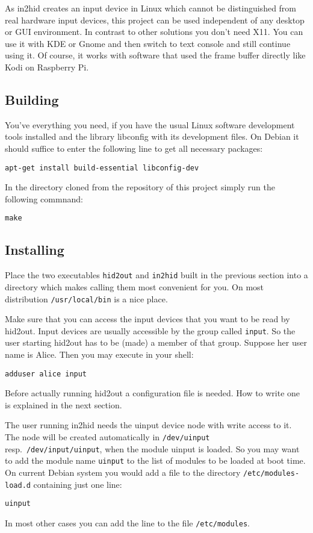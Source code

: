 As in2hid creates an input device in Linux which cannot be distinguished
from real hardware input devices, this project can be used independent
of any desktop or GUI environment. In contrast to other solutions
you don't need X11. You can use it with KDE or Gnome and then switch to 
text console and still continue using it. Of course, it works with 
software that used the frame buffer directly like Kodi on Raspberry Pi.

\subsection{Building}
You've everything you need,
if you have the usual Linux software development tools installed
and the library libconfig with its development files.
On Debian it should suffice to enter the following line to
get all necessary packages:
\begin{verbatim}
apt-get install build-essential libconfig-dev
\end{verbatim}

In the directory cloned from the repository of
this project simply run the following commnand:
\begin{verbatim}
make
\end{verbatim}

\subsection{Installing}
Place the two executables 
\texttt{hid2out} and \texttt{in2hid}
built in the previous section
into a directory which makes calling
them most convenient for you. 
On most distribution \verb|/usr/local/bin| is a nice place.

Make sure that you can access the input devices that you want to 
be read by hid2out. Input devices are usually accessible by the 
group called \verb|input|. So the user starting hid2out 
has to be (made) a member of that group. Suppose her user name 
is Alice. Then you may execute  in your shell:
\begin{verbatim}
adduser alice input
\end{verbatim}
Before actually running hid2out a configuration file is needed.
How to write one is explained in the next section.

The user running in2hid needs the uinput device node with
write  access to it.
The node will be created automatically 
in \verb|/dev/uinput|
resp.~\verb|/dev/input/uinput|, when the module 
uinput is loaded. 
So you may want to add the module name \texttt{uinput} to the 
list of modules to be loaded at boot time.
On current Debian system you would
add a file to the directory \verb|/etc/modules-load.d|
containing just one line:
\begin{verbatim}
uinput
\end{verbatim}
In most other cases you can add the line to the file
\verb|/etc/modules|.

